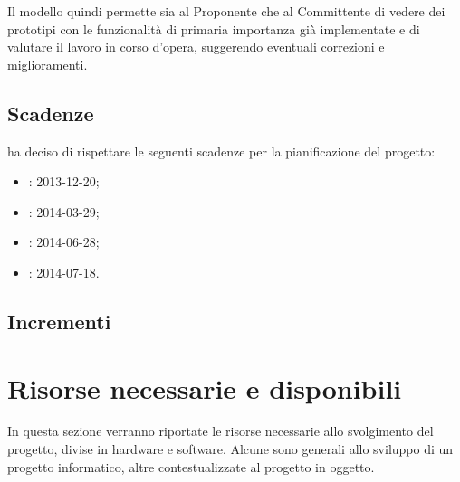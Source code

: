 Il modello quindi permette sia al Proponente che al Committente di vedere dei prototipi con le funzionalità di primaria importanza già implementate e di valutare il lavoro in corso d'opera, suggerendo eventuali correzioni e miglioramenti.


\subsection{Scadenze}
\label{2.6}
\NomeGruppo{} ha deciso di rispettare le seguenti scadenze per la pianificazione del progetto:
\begin{itemize}
\item {}: 2013-12-20;
\item {}:  2014-03-29;
\item {}: 2014-06-28;
\item {}: 2014-07-18.
\end{itemize}

\subsection{Incrementi}

\newpage



\newpage


\section{Risorse necessarie e disponibili}
In questa sezione verranno riportate le risorse necessarie allo svolgimento del progetto, divise in hardware e software. Alcune sono generali allo sviluppo di un progetto informatico, altre contestualizzate al progetto in oggetto.


